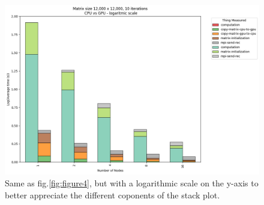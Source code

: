 \documentclass{article}
\begin{document}
    \begin{figure}
        \includegraphics[width=\textwidth]{./plots/plt06}
        \caption{Same as fig.\ref{fig:figure4}, but with a logarithmic scale on the y-axis to better appreciate the different coponents of the stack plot.}
        \label{fig:figure5}
    \end{figure}
\end{document}
